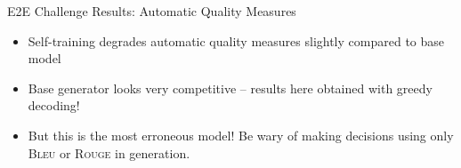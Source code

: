 \begin{frame}[t]{E2E Challenge Results: Automatic Quality Measures}
\begin{itemize}
\item<2->{Self-training degrades automatic quality measures slightly compared to base model }

\item<6->{Base generator looks very competitive -- results here obtained with greedy decoding!} 
\item<7->{\alert{But this is the most erroneous model!} Be wary of making decisions using only \textsc{Bleu} or \textsc{Rouge} in
generation.
}
\end{itemize}
%
%
%
\end{frame}

